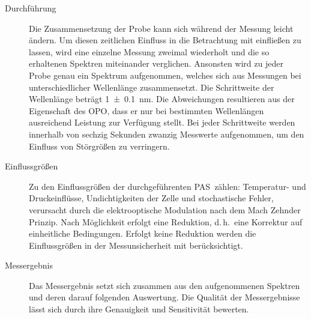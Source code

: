 \begin{description}
    \item[Durchführung] %
        Die Zusammensetzung der Probe kann sich während der Messung leicht ändern.
        Um diesen zeitlichen Einfluss in die Betrachtung mit einfließen zu lassen, wird eine einzelne Messung zweimal wiederholt und die so erhaltenen Spektren miteinander verglichen.
        Ansonsten wird zu jeder Probe genau ein Spektrum aufgenommen, welches sich aus Messungen bei unterschiedlicher Wellenlänge zusammensetzt.
        Die Schrittweite der Wellenlänge beträgt \SI{1 +- 0.1}{nm}.
        Die Abweichungen resultieren aus der Eigenschaft des \gls{OPO}, dass er nur bei bestimmten Wellenlängen ausreichend Leistung zur Verfügung stellt.
        Bei jeder Schrittweite werden innerhalb von sechzig Sekunden zwanzig Messwerte aufgenommen, um den Einfluss von Störgrößen zu verringern.
    
    \item[Einflussgrößen] %
        Zu den Einflussgrößen der durchgeführenten \gls{PAS} zählen: Temperatur- und Druckeinflüsse, Undichtigkeiten der Zelle und stochastische Fehler, verursacht durch die elektrooptische Modulation nach dem Mach Zehnder Prinzip.
        Nach Möglichkeit erfolgt eine Reduktion, d.\,h.\ eine Korrektur auf einheitliche Bedingungen.
        Erfolgt keine Reduktion werden die Einflussgrößen in der Messunsicherheit mit berücksichtigt.
    
    \item[Messergebnis] %
        Das Messergebnis setzt sich zusammen aus den aufgenommenen Spektren und deren darauf folgenden Auswertung.
        Die Qualität der Messergebnisse lässt sich durch ihre Genauigkeit und Sensitivität bewerten.
\end{description}

